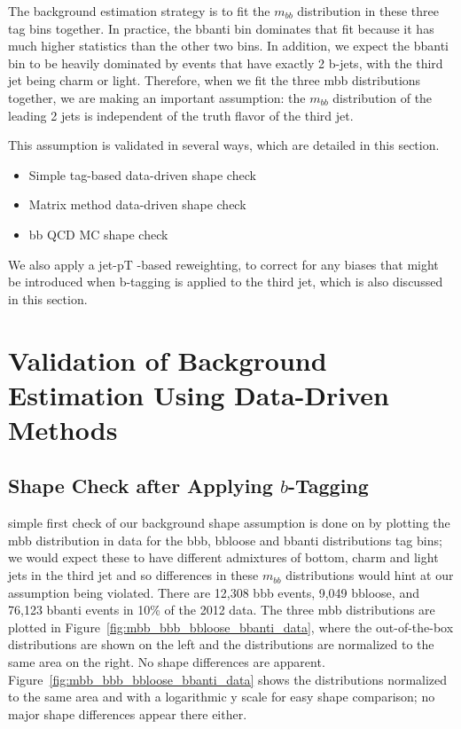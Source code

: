 The background estimation strategy is to fit the $m_{bb}$ distribution in these three tag bins together. In
 practice, the bbanti bin dominates that fit because it has much higher statistics than the other two bins. In
 addition, we expect the bbanti bin to be heavily dominated by events that have exactly 2 b-jets, with the
 third jet being charm or light. Therefore, when we fit the three mbb distributions together, we are making
 an important assumption: the $m_{bb}$ distribution of the leading 2 jets is independent of the truth flavor of the third jet.

This assumption is validated in several ways, which are detailed in this section.
\begin{itemize}
    \item Simple tag-based data-driven shape check
    \item Matrix method data-driven shape check
    \item bb QCD MC shape check
\end{itemize}
 We also apply a jet-pT -based reweighting, to correct for any biases that might be introduced when
 b-tagging is applied to the third jet, which is also discussed in this section.


\section{Validation of Background Estimation Using Data-Driven Methods}
\subsection{Shape Check after Applying $b$-Tagging}
 simple first check of our background shape assumption is done on by plotting the mbb distribution
 in data for the bbb, bbloose and bbanti distributions tag bins; we would expect these to have different
 admixtures of bottom, charm and light jets in the third jet and so differences in these $m_{bb}$ distributions
 would hint at our assumption being violated. There are 12,308 bbb events, 9,049 bbloose, and 76,123
 bbanti events in 10\% of the 2012 data. The three mbb distributions are plotted in Figure~\ref{fig:mbb_bbb_bbloose_bbanti_data}, where the
 out-of-the-box distributions are shown on the left and the distributions are normalized to the same area
 on the right. No shape differences are apparent. Figure~\ref{fig:mbb_bbb_bbloose_bbanti_data} shows the distributions normalized to the
 same area and with a logarithmic y scale for easy shape comparison; no major shape differences appear
 there either.

